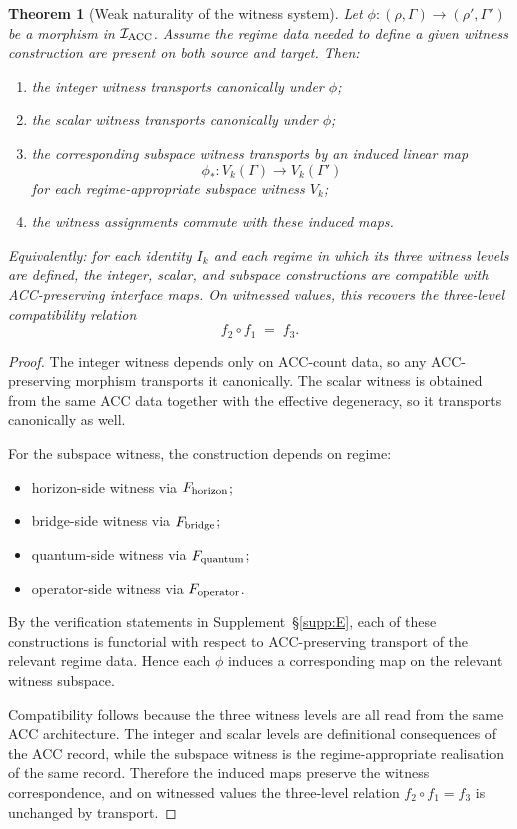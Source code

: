 \documentclass[11pt]{article}
\theoremstyle{plain}
\newtheorem{theorem}{Theorem}[section]
\theoremstyle{definition}
\theoremstyle{remark}
\begin{document}
\begin{theorem}[Weak naturality of the witness system]\label{thm:naturality}
Let $\phi : (\rho,\Gamma)\to(\rho',\Gamma')$ be a morphism in $\mathcal{I}_{\rm ACC}$.  Assume the regime data needed to define a given witness construction are present on both source and target.  Then:

\begin{enumerate}[leftmargin=2.5em,label=\textup{(\roman*)}]
  \item the integer witness transports canonically under $\phi$;
  \item the scalar witness transports canonically under $\phi$;
  \item the corresponding subspace witness transports by an induced linear map
  \[
    \phi_* : V_k(\Gamma)\to V_k(\Gamma')
  \]
  for each regime-appropriate subspace witness $V_k$;
  \item the witness assignments commute with these induced maps.
\end{enumerate}

Equivalently: for each identity $I_k$ and each regime in which its three witness levels are defined, the integer, scalar, and subspace constructions are compatible with ACC-preserving interface maps.  On witnessed values, this recovers the three-level compatibility relation
\[
  f_2\circ f_1 \;=\; f_3.
\]
\end{theorem}

\begin{proof}
The integer witness depends only on ACC-count data, so any ACC-preserving morphism transports it canonically.  The scalar witness is obtained from the same ACC data together with the effective degeneracy, so it transports canonically as well.

For the subspace witness, the construction depends on regime:
\begin{itemize}[leftmargin=2em,itemsep=2pt]
  \item horizon-side witness via $F_{\rm horizon}$;
  \item bridge-side witness via $F_{\rm bridge}$;
  \item quantum-side witness via $F_{\rm quantum}$;
  \item operator-side witness via $F_{\rm operator}$.
\end{itemize}
By the verification statements in Supplement~\S\ref{supp:E}, each of these constructions is functorial with respect to ACC-preserving transport of the relevant regime data.  Hence each $\phi$ induces a corresponding map on the relevant witness subspace.

Compatibility follows because the three witness levels are all read from the same ACC architecture.  The integer and scalar levels are definitional consequences of the ACC record, while the subspace witness is the regime-appropriate realisation of the same record.  Therefore the induced maps preserve the witness correspondence, and on witnessed values the three-level relation $f_2\circ f_1=f_3$ is unchanged by transport.
\end{proof}
\end{document}
